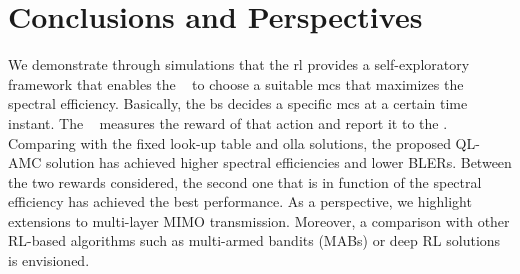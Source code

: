 \section{Conclusions and Perspectives}
\label{sec:amc-conclusion}
We demonstrate through simulations that the \gls{rl} provides a self-exploratory framework that enables the \base~ to choose a suitable \gls{mcs} that maximizes the spectral efficiency.
%
Basically, the \gls{bs} decides a specific \gls{mcs} at a certain time instant. The \ue~ measures the reward of that action and report it to the \base.
%
Comparing with the fixed look-up table and \gls{olla} solutions, the proposed QL-AMC solution has achieved higher spectral efficiencies and lower BLERs.
%
Between the two rewards considered, the second one that is in function of the spectral efficiency has achieved the best performance.
%
As a perspective, we highlight extensions to multi-layer MIMO transmission. Moreover, a comparison with other RL-based algorithms such as multi-armed bandits (MABs) \cite{zhou2015survey} or deep RL solutions \cite{DeepRLSurvey} is envisioned.
%
%

